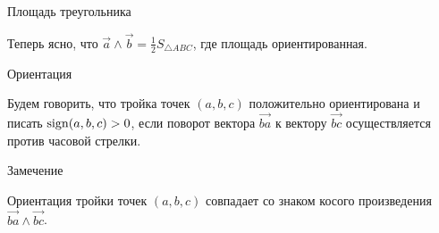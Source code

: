 \begin{frame}{Площадь треугольника}

	Теперь ясно, что $\vec{a} \wedge \vec{b} = \frac{1}{2} S_{\triangle{ABC}}$, где площадь \alert{ориентированная}.

	\begin{center}

	\end{center}

\end{frame}
\begin{frame}{Ориентация}

	\begin{defn}

		Будем говорить, что тройка точек $(a, b, c)$ \alert{положительно ориентирована} и писать $\operatorname{sign}(a, b, c) > 0$, если поворот вектора
		$\overrightarrow{ba}$ к вектору $\overrightarrow{bc}$ осуществляется против часовой стрелки.

	\end{defn}

	\begin{block}{Замечение}

		Ориентация тройки точек $(a, b, c)$ совпадает со знаком косого произведения $\overrightarrow{ba} \wedge \overrightarrow{bc}$.

	\end{block}
\end{frame}

